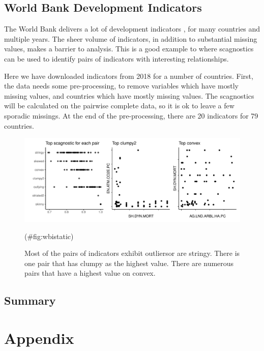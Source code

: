 \hypertarget{world-bank-development-indicators}{%
\subsection{World Bank Development
Indicators}\label{world-bank-development-indicators}}

The World Bank delivers a lot of development indicators \citep{WBI}, for
many countries and multiple years. The sheer volume of indicators, in
addition to substantial missing values, makes a barrier to analysis.
This is a good example to where scagnostics can be used to identify
pairs of indicators with interesting relationships.

Here we have downloaded indicators from 2018 for a number of countries.
First, the data needs some pre-processing, to remove variables which
have mostly missing values, and countries which have mostly missing
values. The scagnostics will be calculated on the pairwise complete
data, so it is ok to leave a few sporadic missings. At the end of the
pre-processing, there are 20 indicators for 79 countries.

\begin{Schunk}
\begin{figure}
\includegraphics[width=1\linewidth]{mason-lee-laa-cook_files/figure-latex/wbistatic-1} \caption[Most of the pairs of indicators exhibit outliersor are stringy]{Most of the pairs of indicators exhibit outliersor are stringy. There is one pair that has clumpy as the highest value. There are numerous pairs that have a highest value on convex.}(\#fig:wbistatic)
\end{figure}
\end{Schunk}

\hypertarget{summary}{%
\subsection{Summary}\label{summary}}

\hypertarget{appendix}{%
\section{Appendix}\label{appendix}}

